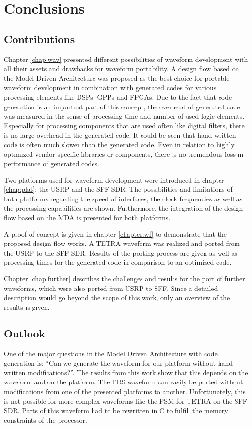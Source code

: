 \chapter{Conclusions}

\section{Contributions}
Chapter \ref{chap:wav} presented different possibilities of waveform development with all their assets and drawbacks for waveform portability. A design flow based on the Model Driven Architecture was proposed as the best choice for portable waveform development in combination with generated codes for various processing elements like DSPs, GPPs and FPGAs. Due to the fact that code generation is an important part of this concept, the overhead of generated code was measured in the sense of processing time and number of used logic elements. Especially for processing components that are used often like digital filters, there is no large overhead in the generated code. It could be seen that hand-written code is often much slower than the generated code. Even in  relation to highly optimized vendor specific libraries or components, there is no tremendous loss in performance of generated codes.  

Two platforms used for waveform development were introduced in chapter \ref{chap:plat}: the USRP and the SFF SDR. The possibilities and limitations of both platforms regarding the speed of interfaces, the clock frequencies as well as the processing capabilities are shown. Furthermore, the integration of the design flow based on the MDA is presented for both platforms.


A proof of concept is given in chapter \ref{chapter:wf} to demonstrate that the proposed design flow works. A TETRA waveform was realized and ported from the USRP to the SFF SDR. Results of the porting process are given as well as processing times for the generated code in comparison to an optimized code. 

Chapter \ref{chap:further} describes the challenges and results for the port of further waveforms, which were also ported from USRP to SFF. Since a detailed description would go beyond the scope of this work, only an overview of the results is given.




\section{Outlook}
One of the major questions in the Model Driven Architecture with code generation is: ``Can we generate the waveform for our platform without hand written modifications?''. The results from this work show that this depends on the waveform and on the platform. The FRS waveform can easily be ported without modifications from one of the presented platforms to another. Unfortunately, this is not possible for more complex waveforms like the \ac{PSM} for TETRA on the SFF SDR. Parts of this waveform had to be rewritten in C to fulfill the memory constraints of the processor.

